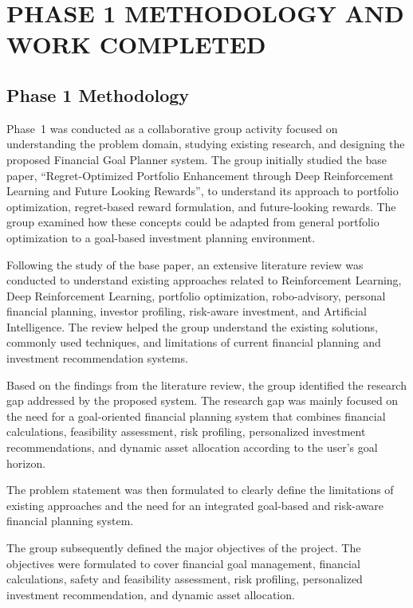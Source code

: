\chapter{\uppercase{Phase 1 Methodology and Work Completed}}

\section{Phase 1 Methodology}
Phase~1 was conducted as a collaborative group activity focused on understanding the problem domain, studying existing research, and designing the proposed Financial Goal Planner system. The group initially studied the base paper, ``Regret-Optimized Portfolio Enhancement through Deep Reinforcement Learning and Future Looking Rewards'', to understand its approach to portfolio optimization, regret-based reward formulation, and future-looking rewards. The group examined how these concepts could be adapted from general portfolio optimization to a goal-based investment planning environment.

Following the study of the base paper, an extensive literature review was conducted to understand existing approaches related to Reinforcement Learning, Deep Reinforcement Learning, portfolio optimization, robo-advisory, personal financial planning, investor profiling, risk-aware investment, and Artificial Intelligence. The review helped the group understand the existing solutions, commonly used techniques, and limitations of current financial planning and investment recommendation systems.

Based on the findings from the literature review, the group identified the research gap addressed by the proposed system. The research gap was mainly focused on the need for a goal-oriented financial planning system that combines financial calculations, feasibility assessment, risk profiling, personalized investment recommendations, and dynamic asset allocation according to the user's goal horizon.

The problem statement was then formulated to clearly define the limitations of existing approaches and the need for an integrated goal-based and risk-aware financial planning system.

The group subsequently defined the major objectives of the project. The objectives were formulated to cover financial goal management, financial calculations, safety and feasibility assessment, risk profiling, personalized investment recommendation, and dynamic asset allocation.

